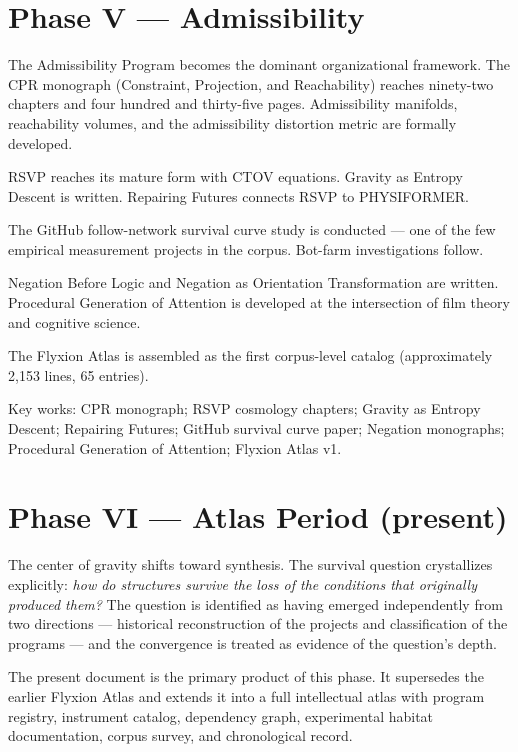 \documentclass[12pt, openany]{book}
\begin{document}
\section{Phase V — Admissibility}

The Admissibility Program becomes the dominant organizational framework.
The CPR monograph (Constraint, Projection, and Reachability) reaches
ninety-two chapters and four hundred and thirty-five pages. Admissibility
manifolds, reachability volumes, and the admissibility distortion metric
are formally developed.

RSVP reaches its mature form with CTOV equations. Gravity as Entropy
Descent is written. Repairing Futures connects RSVP to PHYSIFORMER.

The GitHub follow-network survival curve study is conducted — one of the
few empirical measurement projects in the corpus. Bot-farm investigations
follow.

Negation Before Logic and Negation as Orientation Transformation are
written. Procedural Generation of Attention is developed at the
intersection of film theory and cognitive science.

The Flyxion Atlas is assembled as the first corpus-level catalog
(approximately 2,153 lines, 65 entries).

Key works: CPR monograph; RSVP cosmology chapters; Gravity as Entropy
Descent; Repairing Futures; GitHub survival curve paper; Negation
monographs; Procedural Generation of Attention; Flyxion Atlas v1.

\section{Phase VI — Atlas Period (present)}

The center of gravity shifts toward synthesis. The survival question
crystallizes explicitly: \textit{how do structures survive the loss of
the conditions that originally produced them?} The question is identified
as having emerged independently from two directions — historical
reconstruction of the projects and classification of the programs — and
the convergence is treated as evidence of the question's depth.

The present document is the primary product of this phase. It supersedes
the earlier Flyxion Atlas and extends it into a full intellectual atlas
with program registry, instrument catalog, dependency graph, experimental
habitat documentation, corpus survey, and chronological record.
\end{document}
